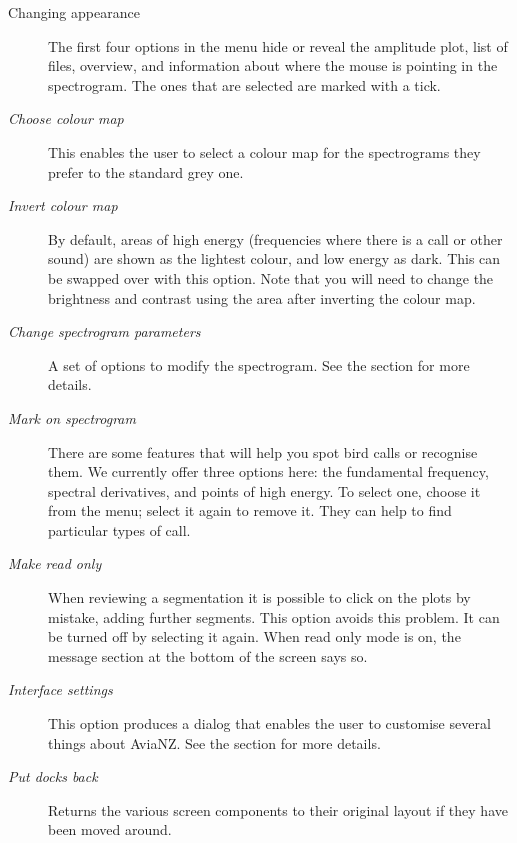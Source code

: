 \documentclass{scrartcl}
\begin{document}
\begin{description}
\item [Changing appearance] The first four options in the menu hide or reveal the amplitude plot, list of files, overview, and information about where the mouse is pointing in the spectrogram. The ones that are selected are marked with a tick. 
\item [\textit{Choose colour map}] This enables the user to select a colour map for the spectrograms they prefer to the standard grey one. 
\item [\textit{Invert colour map}] By default, areas of high energy (frequencies where there is a call or other sound) are shown as the lightest colour, and low energy as dark. This can be swapped over with this option. Note that you will need to change the brightness and contrast using the  area after inverting the colour map.
\item [\textit{Change spectrogram parameters}] A set of options to modify the spectrogram.  See the section  for more details. %
\item [\textit{Mark on spectrogram}] There are some features that will help you spot bird calls or recognise them. We currently offer three options here: the fundamental frequency, spectral derivatives, and points of high energy. To select one, choose it from the menu; select it again to remove it. They can help to find particular types of call. 
\item [\textit{Make read only}] When reviewing a segmentation it is possible to click on the plots by mistake, adding further segments. This option avoids this problem. It can be turned off by selecting it again. When read only mode is on, the message section at the bottom of the screen says so. 
\item [\textit{Interface settings}] This option produces a dialog that enables the user to customise several things about AviaNZ. See the section  for more details.
\item [\textit{Put docks back}] Returns the various screen components to their original layout if they have been moved around. 
\end{description}
\end{document}
